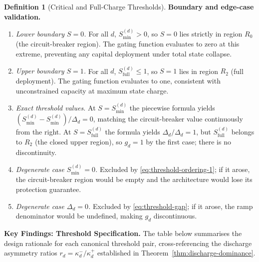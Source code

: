 \documentclass[12pt,openany]{book}
\numberwithin{equation}{chapter}
\theoremstyle{plain}
\theoremstyle{definition}
\newtheorem{definition}[theorem]{Definition}
\theoremstyle{remark}
\def\mathcal#1{#1}%
\begin{document}
\begin{definition}[Critical and Full-Charge Thresholds]
\medskip
\noindent\textbf{Boundary and edge-case validation.}
\begin{enumerate}
  \item \emph{Lower boundary $\mathcal{S} = 0$.}
        For all $d$, $\mathcal{S}_{\min}^{(d)} > 0$, so
        $\mathcal{S} = 0$ lies strictly in region $R_0$
        (the circuit-breaker region).  The gating function
        evaluates to zero at this extreme, preventing any
        capital deployment under total state collapse.
  \item \emph{Upper boundary $\mathcal{S} = 1$.}
        For all $d$, $\mathcal{S}_{\mathrm{full}}^{(d)} \leq 1$,
        so $\mathcal{S} = 1$ lies in region $R_2$ (full
        deployment).  The gating function evaluates to one,
        consistent with unconstrained capacity at maximum
        state charge.
  \item \emph{Exact threshold values.}
        At $\mathcal{S} = \mathcal{S}_{\min}^{(d)}$ the
        piecewise formula yields
        $(\mathcal{S}_{\min}^{(d)} -
        \mathcal{S}_{\min}^{(d)})/\Delta_d = 0$, matching the
        circuit-breaker value continuously from the right.
        At $\mathcal{S} = \mathcal{S}_{\mathrm{full}}^{(d)}$
        the formula yields $\Delta_d / \Delta_d = 1$, but
        $\mathcal{S}_{\mathrm{full}}^{(d)}$ belongs to $R_2$
        (the closed upper region), so $g_d = 1$ by the first
        case; there is no discontinuity.
  \item \emph{Degenerate case $\mathcal{S}_{\min}^{(d)} = 0$.}
        Excluded by \eqref{eq:threshold-ordering-1}; if it
        arose, the circuit-breaker region would be empty and
        the architecture would lose its protection guarantee.
  \item \emph{Degenerate case $\Delta_d = 0$.}
        Excluded by \eqref{eq:threshold-gap}; if it arose,
        the ramp denominator would be undefined, making $g_d$
        discontinuous.
\end{enumerate}
\end{definition}

\noindent\textbf{Key Findings: Threshold Specification.}
The table below summarises the design rationale for each
canonical threshold pair, cross-referencing the discharge
asymmetry ratios $r_d = \kappa_d^{-}/\kappa_d^{+}$ established
in Theorem~\ref{thm:discharge-dominance}.
\end{document}
